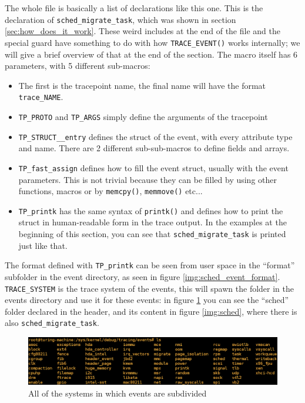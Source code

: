 \documentclass[10pt, oneside]{book}
\begin{document}
The whole file is basically a list of declarations like this one. This is the declaration of \verb|sched_migrate_task|, which was shown in section \ref{sec:how_does_it_work}. These weird includes at the end of the file and the special guard have something to do with how \verb|TRACE_EVENT()| works internally; we will give a brief overview of that at the end of the section. The macro itself has 6 parameters, with 5 different sub-macros:
\begin{itemize}
    \item The first is the tracepoint name, the final name will have the format \verb|trace_NAME|.
    \item \verb|TP_PROTO| and \verb|TP_ARGS| simply define the arguments of the tracepoint
    \item \verb|TP_STRUCT__entry| defines the struct of the event, with every attribute type and name. There are 2 different sub-sub-macros to define fields and arrays.
    \item \verb|TP_fast_assign| defines how to fill the event struct, usually with the event parameters. This is not trivial because they can be filled by using other functions, macros or by \verb|memcpy()|, \verb|memmove()| etc...
    \item \verb|TP_printk| has the same syntax of \verb|printk()| and defines how to print the struct in human-readable form in the trace output. In the examples at the beginning of this section, you can see that \verb|sched_migrate_task| is printed just like that.
\end{itemize}

The format defined with \verb|TP_printk| can be seen from user space in the ``format'' subfolder in the event directory, as seen in figure \ref{img:sched_event_format}. \verb|TRACE_SYSTEM| is the trace system of the events, this will spawn the folder in the events directory and use it for these events: in figure \ref{img:systems} you can see the ``sched'' folder declared in the header, and its content in figure \ref{img:sched}, where there is also \verb|sched_migrate_task|. 
\begin{figure}[ht]
\includegraphics[width=\textwidth]{images/shell_trace_systems.png} 
\caption{All of the systems in which events are subdivided}
\label{img:systems}
\end{figure}
\end{document}
